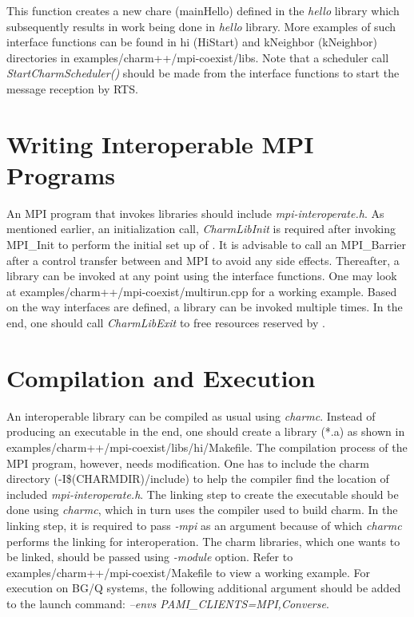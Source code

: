 \begin{itemize}
This function creates a new chare (mainHello) defined in the {\em hello} library which
subsequently results in work being done in {\em hello} library.
More examples of such interface functions can
be found in hi (HiStart) and kNeighbor (kNeighbor) directories in
examples/charm++/mpi-coexist/libs. Note that a scheduler call {\em
StartCharmScheduler()} should be made from the interface functions to start the
message reception by \charmpp{} RTS.
\end{itemize}

\section{Writing Interoperable MPI Programs}
An MPI program that invokes \charmpp{} libraries should include {\em mpi-interoperate.h}.
As mentioned earlier, an initialization call, {\em CharmLibInit} is
required after invoking MPI\_Init to perform the initial set up of \charmpp{}.
It is advisable to call an MPI\_Barrier after a control transfer between \charmpp{}
and MPI to avoid any side effects. Thereafter, a \charmpp{} library can be invoked at
any point using the interface functions. One may look at
examples/charm++/mpi-coexist/multirun.cpp for a working example. Based on the
way interfaces are defined, a library can be invoked multiple times. In the end,
one should call {\em CharmLibExit} to free resources reserved by \charmpp{}.

\section{Compilation and Execution}
An interoperable \charmpp{} library can be compiled as usual using {\em charmc}.
Instead of producing an executable in the end, one should create a library (*.a)
as shown in examples/charm++/mpi-coexist/libs/hi/Makefile. The compilation
process of the MPI program, however, needs modification. One has to include the
charm directory (-I\$(CHARMDIR)/include) to help the compiler find the location of
included {\em mpi-interoperate.h}. The linking step to create the executable
should be done using {\em charmc}, which in turn uses the compiler used to build
charm. In the linking step, it is required to pass {\em -mpi} as an argument
because of which {\em charmc} performs the linking for interoperation. The charm
libraries, which one wants to be linked, should be passed using {\em -module}
option. Refer to examples/charm++/mpi-coexist/Makefile to view a working
example. For execution on BG/Q systems, the following additional argument should be
added to the launch command: {\em --envs PAMI\_CLIENTS=MPI,Converse}.

